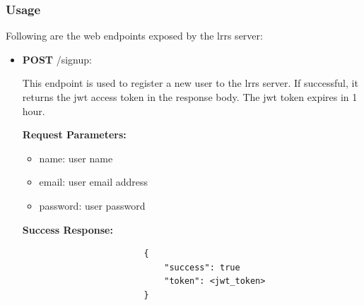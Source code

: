 \documentclass{article}
\begin{document}
        
        \subsubsection{Usage}
        Following are the web endpoints exposed by the \gls{lrrs} server:
        \begin{itemize}
            \item \textbf{POST} /signup:
                \begin{addmargin}[1em]{2em}%
                    This endpoint is used to register a new user to the \gls{lrrs} server. If successful, it returns the jwt access token in the response body. The jwt token expires in 1 hour.
                    \par\textbf{Request Parameters:}
                    \begin{itemize}
                        \item name: user name
                        \item email: user email address
                        \item password: user password
                    \end{itemize}
                    \par\textbf{Success Response:}
                    \begin{listing}[H]
                    \begin{verbatim}
                        {     
                            "success": true
                            "token": <jwt_token>
                        }
                    \end{verbatim}
                    \end{listing}
                \end{addmargin}
                

\end{itemize}
\end{document}
